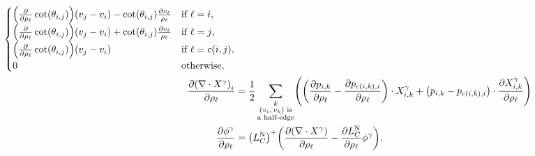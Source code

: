 \begin{align*}
\begin{cases}
		\pof{\frac{\partial}{\partial \rho_\ell}\cot\pof{\theta_{i, j}}}\pof{v_j - v_i} - \cot\pof{\theta_{i, j}}\frac{\partial v_\ell}{\rho_\ell} & \text{if \(\ell = i\)}, \\
		\pof{\frac{\partial}{\partial \rho_\ell}\cot\pof{\theta_{i, j}}}\pof{v_j - v_i} + \cot\pof{\theta_{i, j}}\frac{\partial v_\ell}{\rho_\ell} & \text{if \(\ell = j\)}, \\
		\pof{\frac{\partial}{\partial \rho_\ell}\cot\pof{\theta_{i, j}}}\pof{v_j - v_i} & \text{if \(\ell = c\pof{i, j}\)}, \\
		0 & \text{otherwise},
	\end{cases} \\
	\frac{\partial \pof{\nabla \cdot X^\gamma}_i}{\partial \rho_\ell} &= \frac{1}{2}\sum_{\substack{k \\ \text{\(\pof{v_i, v_k}\) is} \\ \text{a half-edge}}}\pof{\pof{\frac{\partial p_{i, k}}{\partial \rho_\ell} - \frac{\partial p_{c\pof{i, k}, i}}{\partial \rho_\ell}} \cdot X^\gamma_{i, k} + \pof{p_{i, k} - p_{c\pof{i, k}, i}} \cdot \frac{\partial X^\gamma_{i, k}}{\partial \rho_\ell}} \\
	\frac{\partial \phi^\gamma}{\partial \rho_\ell} &= \pof{L_C^{\text{N}}}^+\pof{\frac{\partial \pof{\nabla \cdot X^\gamma}}{\partial \rho_\ell} - \frac{\partial L_C^{\text{N}}}{\partial \rho_\ell}\phi^\gamma}.
\end{align*}
